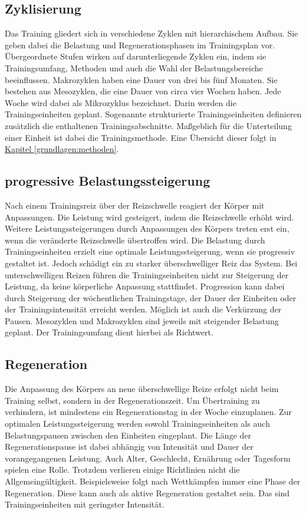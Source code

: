 \subsection{Zyklisierung}
Das Training gliedert sich in verschiedene Zyklen mit hierarchischem Aufbau. Sie geben dabei die Belastung und Regenerationsphasen im Trainingsplan vor. Übergeordnete Stufen wirken auf darunterliegende Zyklen ein, indem sie Trainingsumfang, Methoden und auch die Wahl der Belastungsbereiche beeinflussen. \cite[283]{Trainingswissenschaft}
Makrozyklen haben eine Dauer von drei bis fünf Monaten. Sie bestehen aus Mesozyklen, die eine Dauer von circa vier Wochen haben. Jede Woche wird dabei als Mikrozyklus bezeichnet. Darin werden die Trainingseinheiten geplant. Sogenannte strukturierte Trainingseinheiten definieren zusätzlich die enthaltenen Trainingsabschnitte. Maßgeblich für die Unterteilung einer Einheit ist dabei die Trainingsmethode. Eine Übersicht dieser folgt in \hyperref[grundlagen:methoden]{Kapitel \ref{grundlagen:methoden}}.
\subsection{progressive Belastungssteigerung}
Nach einem Trainingsreiz über der Reizschwelle reagiert der Körper mit Anpassungen. Die Leistung wird gesteigert, indem die Reizschwelle erhöht wird. Weitere Leistungssteigerungen durch Anpassungen des Körpers treten erst ein, wenn die veränderte Reizschwelle übertroffen wird. Die Belastung durch Trainingseinheiten erzielt eine optimale Leistungssteigerung, wenn sie progressiv gestaltet ist. Jedoch schädigt ein zu starker überschwelliger Reiz das System. Bei unterschwelligen Reizen führen die Trainingseinheiten nicht zur Steigerung der Leistung, da keine körperliche Anpassung stattfindet. \cite[58]{Seidenspinner2005} Progression kann dabei durch Steigerung der wöchentlichen Trainingstage, der Dauer der Einheiten oder der Trainingsintensität erreicht werden. Möglich ist auch die Verkürzung der Pausen.\newline 
Mesozyklen und Makrozyklen sind jeweils mit steigender Belastung geplant. Der Trainingsumfang dient hierbei als Richtwert.\cite[60-61]{Radsporttraining}
\subsection{Regeneration}
Die Anpassung des Körpers an neue überschwellige Reize erfolgt nicht beim Training selbst, sondern in der Regenerationszeit. Um Übertraining zu verhindern, ist mindestens ein Regenerationstag in der Woche einzuplanen. 
Zur optimalen Leistungssteigerung werden sowohl Trainingseinheiten als auch Belastungspausen zwischen den Einheiten eingeplant. Die Länge der Regenerationspause ist dabei abhängig von Intensität und Dauer der vorangegangenen Leistung. Auch Alter, Geschlecht, Ernährung oder Tagesform spielen eine Rolle. Trotzdem verlieren einige Richtlinien nicht die Allgemeingültigkeit. Beispielsweise folgt nach Wettkämpfen immer eine Phase der Regeneration. Diese kann auch als aktive Regeneration gestaltet sein. Das sind Trainingseinheiten mit geringster Intensität.
